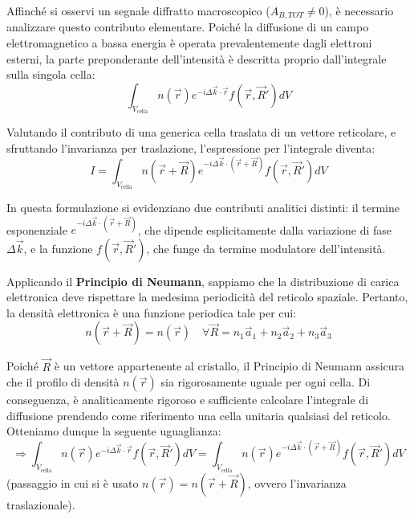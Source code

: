 Affinché si osservi un segnale diffratto macroscopico (\( A_{B,TOT} \neq 0 \)), è necessario analizzare questo contributo elementare. Poiché la diffusione di un campo elettromagnetico a bassa energia è operata prevalentemente dagli elettroni esterni, la parte preponderante dell'intensità è descritta proprio dall'integrale sulla singola cella:
\begin{equation}
    \int_{V_{\text{cella}}} n(\vec{r}) e^{-i \Delta\vec{k} \cdot \vec{r}} f(\vec{r}, \vec{R}') dV
\end{equation}

Valutando il contributo di una generica cella traslata di un vettore reticolare, e sfruttando l'invarianza per traslazione, l'espressione per l'integrale diventa:
\begin{equation}
    I = \int_{V_{\text{cella}}} n(\vec{r} + \vec{R}) e^{-i \Delta\vec{k} \cdot (\vec{r} + \vec{R})} f(\vec{r}, \vec{R}') dV
\end{equation}

In questa formulazione si evidenziano due contributi analitici distinti: il termine esponenziale \( e^{-i \Delta\vec{k} \cdot (\vec{r} + \vec{R})} \), che dipende esplicitamente dalla variazione di fase \( \Delta\vec{k} \), e la funzione \( f(\vec{r}, \vec{R}') \), che funge da termine modulatore dell'intensità.

Applicando il \textbf{Principio di Neumann}, sappiamo che la distribuzione di carica elettronica deve rispettare la medesima periodicità del reticolo spaziale. Pertanto, la densità elettronica è una funzione periodica tale per cui:
\begin{equation}
    n(\vec{r} + \vec{R}) = n(\vec{r}) \quad \forall \vec{R} = n_1\vec{a}_1 + n_2\vec{a}_2 + n_3\vec{a}_3
\end{equation}

Poiché \( \vec{R} \) è un vettore appartenente al cristallo, il Principio di Neumann assicura che il profilo di densità \( n(\vec{r}) \) sia rigorosamente uguale per ogni cella. Di conseguenza, è analiticamente rigoroso e sufficiente calcolare l'integrale di diffusione prendendo come riferimento una cella unitaria qualsiasi del reticolo.
Otteniamo dunque la seguente uguaglianza:
\begin{equation}
    \Rightarrow \int_{V_{\text{cella}}} n(\vec{r}) e^{-i \Delta\vec{k} \cdot \vec{r}} f(\vec{r}, \vec{R}') dV = \int_{V_{\text{cella}}} n(\vec{r}) e^{-i \Delta\vec{k} \cdot (\vec{r} + \vec{R})} f(\vec{r}, \vec{R}') dV
\end{equation}
(passaggio in cui si è usato \( n(\vec{r}) = n(\vec{r} + \vec{R}) \), ovvero l'invarianza traslazionale).

